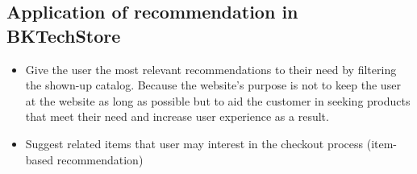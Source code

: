 \subsection{Application of recommendation in BKTechStore}
\begin{itemize}
    \item Give the user the most relevant recommendations to their need by filtering the shown-up catalog. Because the website’s purpose is not to keep the user at the website as long as possible but to aid the customer in seeking products that meet their need and increase user experience as a result.
    \item Suggest related items that user may interest in the checkout process (item-based recommendation)
\end{itemize}